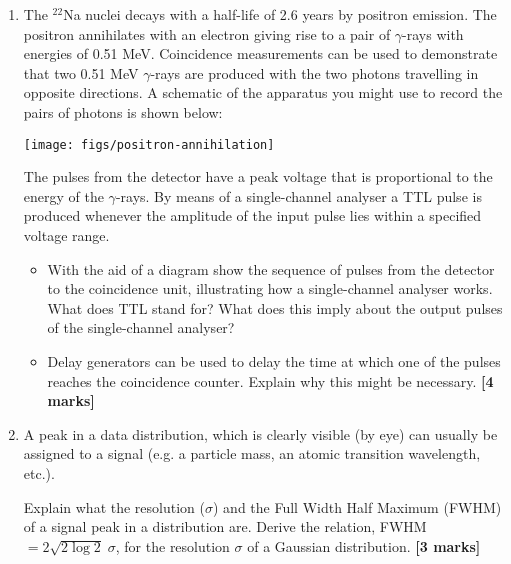 \begin{enumerate}
In a particle physics experiment, a drift chamber with 384~anode wires is used to measure trajectories of charged particles.
The drift velocity is $1\; {\rm cm/\mu s}$, the maximum drift time is $6.5 \; \mu$s
and a spatial resolution of better than $200\; \mu$m is needed.
What electronics equipment is required to read out the signal pulses of the drift chamber? State its main specifications.
\hfill {\bf [5 marks]}\\

\item The $^{22}$Na nuclei decays with a half-life of 2.6 years by positron emission.
The positron annihilates with an electron giving rise to a pair of $\gamma$-rays with energies of 0.51 MeV.
Coincidence measurements can be used to demonstrate that two 0.51 MeV $\gamma$-rays are produced with the two photons travelling in opposite directions.
A schematic of the apparatus you might use to record the pairs of photons is shown below:
%
\begin{center}
  {\texttt{[image: figs/positron-annihilation]}}
\end{center}
%
The pulses from the detector have a peak voltage that is proportional to the energy of the $\gamma$-rays.
By means of a single-channel analyser a TTL pulse is produced whenever the amplitude of the input pulse lies within a specified voltage range.
\begin{itemize}
\item With the aid of a diagram show the sequence of pulses from the detector to the coincidence unit, illustrating how a single-channel analyser works.
What does TTL stand for?
What does this imply about the output pulses of the single-channel analyser?
\item Delay generators can be used to delay the time at which one of the pulses reaches the coincidence counter.
Explain why this might be necessary. %
%
\hfill {\bf [4 marks]}
%
\end{itemize}



\item A peak in a data distribution, which is clearly visible (by eye) can usually be assigned to a signal (e.g. a particle mass, an atomic transition wavelength, etc.).

Explain what the resolution ($\sigma$) and the Full Width Half Maximum (FWHM) of a signal peak in a distribution are.
Derive the relation, FWHM$ = 2 \sqrt{2 \log 2}\; \sigma$, for the resolution $\sigma$ of a Gaussian distribution.
\hfill {\bf [3 marks]}\\


\end{enumerate}
